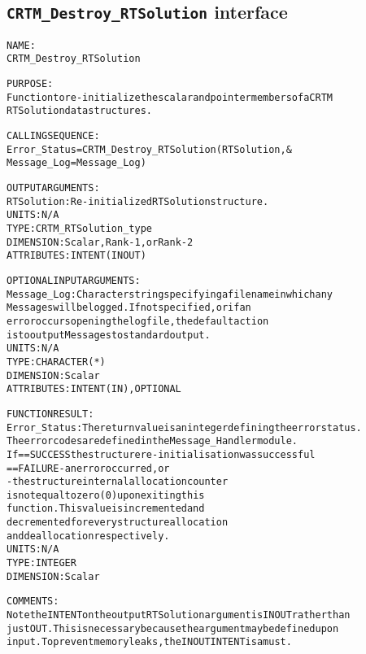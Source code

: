 \subsection{\texttt{CRTM\_Destroy\_RTSolution} interface}
  \label{sec:CRTM_Destroy_RTSolution_interface}
  \begin{alltt}
 
  NAME:
        CRTM_Destroy_RTSolution
  
  PURPOSE:
        Function to re-initialize the scalar and pointer members of a CRTM
        RTSolution data structures.
 
  CALLING SEQUENCE:
        Error_Status = CRTM_Destroy_RTSolution( RTSolution             , &
                                                Message_Log=Message_Log  )
  
  OUTPUT ARGUMENTS:
        RTSolution:   Re-initialized RTSolution structure.
                      UNITS:      N/A
                      TYPE:       CRTM_RTSolution_type
                      DIMENSION:  Scalar, Rank-1, or Rank-2
                      ATTRIBUTES: INTENT(IN OUT)
 
  OPTIONAL INPUT ARGUMENTS:
        Message_Log:  Character string specifying a filename in which any
                      Messages will be logged. If not specified, or if an
                      error occurs opening the log file, the default action
                      is to output Messages to standard output.
                      UNITS:      N/A
                      TYPE:       CHARACTER(*)
                      DIMENSION:  Scalar
                      ATTRIBUTES: INTENT(IN), OPTIONAL
 
  FUNCTION RESULT:
        Error_Status: The return value is an integer defining the error status.
                      The error codes are defined in the Message_Handler module.
                      If == SUCCESS the structure re-initialisation was successful
                         == FAILURE - an error occurred, or
                                    - the structure internal allocation counter
                                      is not equal to zero (0) upon exiting this
                                      function. This value is incremented and
                                      decremented for every structure allocation
                                      and deallocation respectively.
                      UNITS:      N/A
                      TYPE:       INTEGER
                      DIMENSION:  Scalar
 
  COMMENTS:
        Note the INTENT on the output RTSolution argument is IN OUT rather than
        just OUT. This is necessary because the argument may be defined upon
        input. To prevent memory leaks, the IN OUT INTENT is a must.
 
  \end{alltt}

